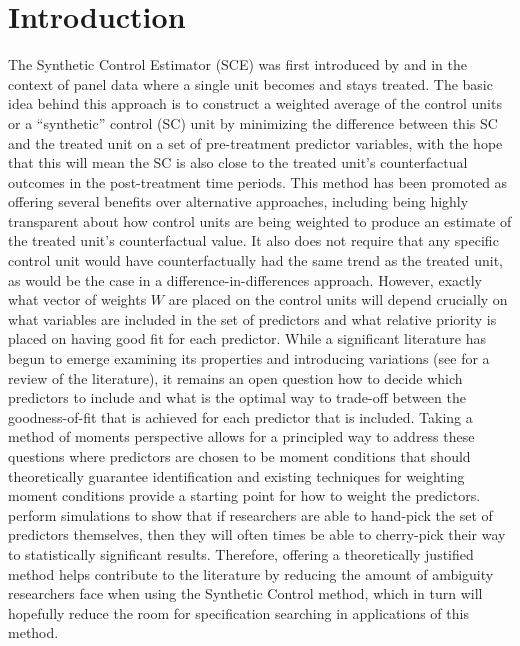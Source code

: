 \documentclass{article}
\begin{document}
\section{Introduction} \label{Intro}
The Synthetic Control Estimator (SCE) was first introduced by \cite{AandG} and \cite{Abadie2010} in the context of panel data where a single unit becomes and stays treated. The basic idea behind this approach is to construct a weighted average of the control units or a “synthetic” control (SC) unit by minimizing the difference between this SC and the treated unit on a set of pre-treatment predictor variables, with the hope that this will mean the SC is also close to the treated unit's counterfactual outcomes in the post-treatment time periods. This method has been promoted as offering several benefits over alternative approaches, including being highly transparent about how control units are being weighted to produce an estimate of the treated unit's counterfactual value. It also does not require that any specific control unit would have counterfactually had the same trend as the treated unit, as would be the case in a difference-in-differences approach. However, exactly what vector of weights $W$ are placed on the control units will depend crucially on what variables are included in the set of predictors and what relative priority is placed on having good fit for each predictor. While a significant literature has begun to emerge examining its properties and introducing variations (see \cite{LitReview} for a review of the literature), it remains an open question how to decide which predictors to include and what is the optimal way to trade-off between the goodness-of-fit that is achieved for each predictor that is included. Taking a method of moments perspective allows for a principled way to address these questions where predictors are chosen to be moment conditions that should theoretically guarantee identification and existing techniques for weighting moment conditions provide a starting point for how to weight the predictors. \cite{cherrypicking} perform simulations to show that if researchers are able to hand-pick the set of predictors themselves, then they will often times be able to cherry-pick their way to statistically significant results. Therefore, offering a theoretically justified method helps contribute to the literature by reducing the amount of ambiguity researchers face when using the Synthetic Control method, which in turn will hopefully reduce the room for specification searching in applications of this method.
\end{document}
